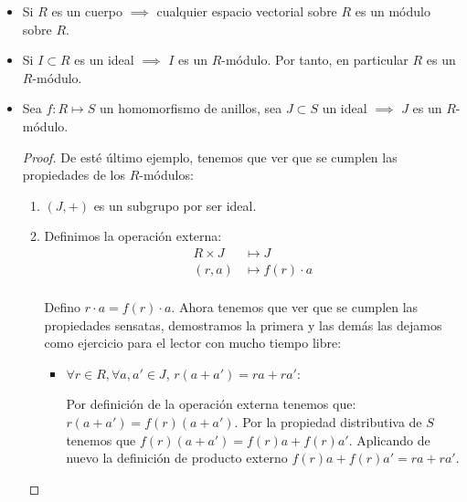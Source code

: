 \begin{example}
	\begin{itemize}
		\item Si $R$ es un cuerpo $\implies$ cualquier espacio vectorial sobre $R$ es un módulo sobre $R$.
		\item Si $I \subset R$ es un ideal $\implies$ $I$ es un $R$-módulo. Por tanto, en particular $R$ es un $R$-módulo.
		\item Sea $f: R \longmapsto S$ un homomorfismo de anillos, sea $J \subset S$ un ideal $\implies$ $J$ es un $R$-módulo.
		\begin{proof}
			De esté último ejemplo, tenemos que ver que se cumplen las propiedades de los $R$-módulos:
			\begin{enumerate}
				\item $(J,+)$ es un subgrupo por ser ideal.
				\item Definimos la operación externa:
				\begin{align*}
					R×J & \longmapsto  J \\
					(r,a) & \longmapsto  f(r)\cdot a \\
				\end{align*}

				Defino $r\cdot a=f(r)\cdot a$. Ahora tenemos que ver que se cumplen las propiedades sensatas, demostramos la primera y las demás las dejamos como ejercicio para el lector con mucho tiempo libre:
				\begin{itemize}
					\item $\forall r \in R, \forall a,a' \in J$, $r(a+a')=ra+ra'$:

					Por definición de la operación externa tenemos que: $r(a+a')=f(r)(a+a')$. Por la propiedad distributiva de $S$ tenemos que $f(r)(a+a')=f(r)a+f(r)a'$. Aplicando de nuevo la definición de producto externo $f(r)a+f(r)a'=ra+ra'$.
				\end{itemize}
			\end{enumerate}
		\end{proof}
	\end{itemize}
\end{example}

